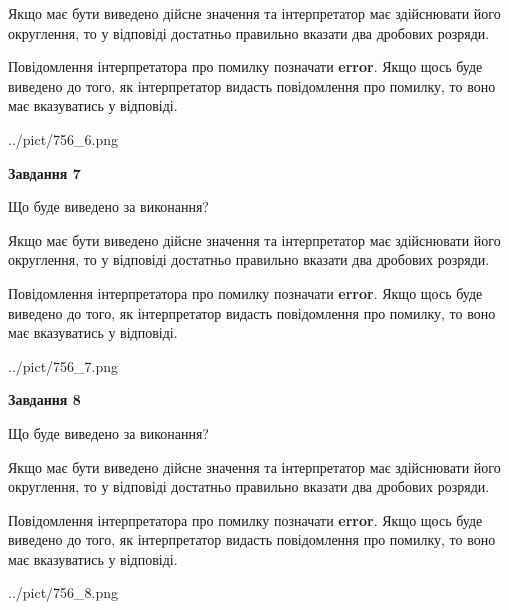 \documentclass[12pt, ukrainian]{article}
\begin{document}
{\begin {Large}
Якщо має бути виведено дійсне значення та інтерпретатор має здійснювати його округлення, 
то у відповіді достатньо правильно вказати два дробових розряди.

Повідомлення інтерпретатора про помилку позначати \textbf{error}.
Якщо щось буде виведено до того, як інтерпретатор видасть повідомлення про помилку, 
то воно має вказуватись у відповіді. \par

\begin{center}
	{../pict/756_6.png}
\end{center}
\newpage

{\begin {center}\textbf{Завдання 7}\end {center}}\par
Що буде виведено за виконання? \par

Якщо має бути виведено дійсне значення та інтерпретатор має здійснювати його округлення, 
то у відповіді достатньо правильно вказати два дробових розряди.

Повідомлення інтерпретатора про помилку позначати \textbf{error}.
Якщо щось буде виведено до того, як інтерпретатор видасть повідомлення про помилку, 
то воно має вказуватись у відповіді. \par

\begin{center}
	{../pict/756_7.png}
\end{center}
\newpage

{\begin {center}\textbf{Завдання 8}\end {center}}\par
Що буде виведено за виконання? \par

Якщо має бути виведено дійсне значення та інтерпретатор має здійснювати його округлення, 
то у відповіді достатньо правильно вказати два дробових розряди.

Повідомлення інтерпретатора про помилку позначати \textbf{error}.
Якщо щось буде виведено до того, як інтерпретатор видасть повідомлення про помилку, 
то воно має вказуватись у відповіді. \par

\begin{center}
	{../pict/756_8.png}
\end{center}
\newpage


\end{Large}}
\end{document}
